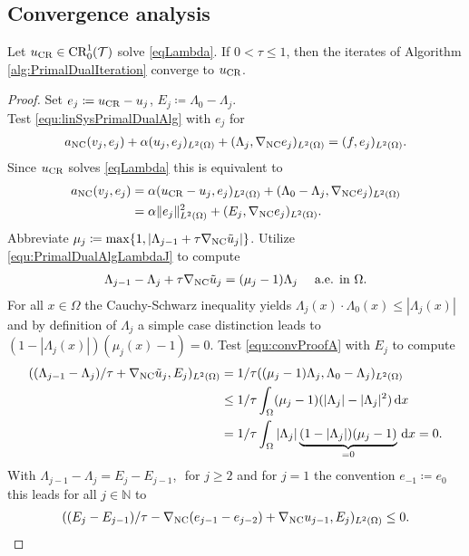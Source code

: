 \subsection{Convergence analysis}

\begin{theorem}[convergence]
  Let $u_{\textup{CR}}\in \textup{CR}^1_0(\mathcal T)$ solve \eqref{eqLambda}.
  If $0 < \tau \leq 1$, then the iterates of Algorithm
  \ref{alg:PrimalDualIteration} converge to $u_{\textup{CR}}$.
\end{theorem}

\begin{proof}
  Set $e_j \coloneqq u_{\textup{CR}}-u_j$, $E_j\coloneqq \Lambda_0-\Lambda_j$.\\
  Test \eqref{equ:linSysPrimalDualAlg} with $e_j$ for
  \begin{align*}
    a_\textup{NC}(v_j,e_j) + \alpha(u_j,e_j)_{L^2(\Omega)} 
    + (\Lambda_j,\nabla_\textup{NC}e_j)_{L^2(\Omega)}
    = 
    (f,e_j)_{L^2(\Omega)}.
  \end{align*}
  Since $u_{\textup{CR}}$ solves \eqref{eqLambda} this is equivalent to
  \begin{align}
    a_\textup{NC}(v_j,e_j) &= 
    \alpha(u_\textup{CR}-u_j,e_j)_{L^2(\Omega)} 
    + (\Lambda_0-\Lambda_j,\nabla_\textup{NC}e_j)_{L^2(\Omega)} \notag\\
    &= 
    \alpha\Vert e_j\Vert_{L^2(\Omega)}^2
    + (E_j,\nabla_\textup{NC}e_j)_{L^2(\Omega)}.
  \end{align}
  Abbreviate $\mu_j\coloneqq \max\{1,|\Lambda_{j-1}+\tau
  \nabla_\textup{NC}\tilde{u}_j|\}$.
  Utilize \eqref{equ:PrimalDualAlgLambdaJ} to compute
  \begin{align}
    \label{equ:convProofA}
    \Lambda_{j-1}-\Lambda_j+\tau \nabla_\textup{NC}\tilde{u}_j 
    = (\mu_j-1)\Lambda_j \quad\text{ a.e. in }\Omega.
  \end{align}
  For all $x\in\Omega$ the Cauchy-Schwarz inequality yields
  $\Lambda_j(x)\cdot\Lambda_0(x)\leq|\Lambda_j(x)|$ 
  and by definition of $\Lambda_j$ a simple case distinction leads to
  $(1-|\Lambda_j(x)|)(\mu_j(x)-1)=0$.
  Test \eqref{equ:convProofA} with $E_j$ to compute
  \begin{align*}
    ( (\Lambda_{j-1}-\Lambda_j)/\tau+\nabla_\textup{NC}\tilde{u}_j,
    E_j)_{L^2(\Omega)}
    &= 
    1/\tau ( (\mu_j-1)\Lambda_j,\Lambda_0-\Lambda_j)_{L^2(\Omega)}\\
    &\leq
    1/\tau \int_\Omega (\mu_j-1)(|\Lambda_j|-|\Lambda_j|^2)\,\mathrm dx\\
    &=
    1/\tau \int_\Omega |\Lambda_j|
    \underbrace{(1-|\Lambda_j|)(\mu_j-1)}_{=0}\,\mathrm dx =0.
  \end{align*}
  With $\Lambda_{j-1}-\Lambda_j=E_j-E_{j-1}$, 
  $ $
  for $j\geq 2$ and for $j=1$ the convention $e_{-1}\coloneqq e_0$
  this leads for all $j\in \mathbb N$ to
  \begin{align}
    \label{equ:convProofB}
    ( (E_j-E_{j-1})/\tau-\nabla_\textup{NC}(e_{j-1}-e_{j-2})+
    \nabla_\textup{NC}u_{j-1},E_j)_{L^2(\Omega)}\leq 0.
  \end{align}

  

\end{proof}

